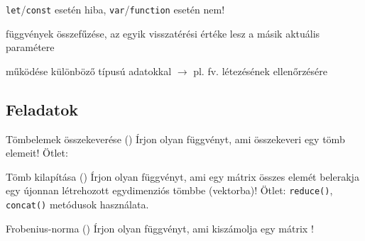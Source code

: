 \begin{frame}
  \footnotesize
  \begin{exampleblock}{ \texttt{let}/\texttt{const} esetén hiba, \texttt{var}/\texttt{function} esetén nem!}
      \scriptsize
      \vspace{-0.3cm}
      
      \vspace{-0.3cm}
  \end{exampleblock}
\end{frame}

\begin{frame}
  \begin{exampleblock}{ függvények összefűzése, az egyik visszatérési értéke lesz a másik aktuális paramétere}
      \footnotesize
      
  \end{exampleblock}
\end{frame}

\begin{frame}
  \begin{exampleblock}{ működése különböző típusú adatokkal $\to$ pl. fv. létezésének ellenőrzésére}
      
  \end{exampleblock}
\end{frame}

\subsection{Feladatok}

\begin{frame}
  \begin{exampleblock}{Tömbelemek összekeverése ()}
    Írjon olyan függvényt, ami összekeveri egy tömb elemeit! Ötlet: 
  \end{exampleblock}
  \vfill
  \begin{exampleblock}{Tömb kilapítása ()}
    Írjon olyan függvényt, ami egy mátrix összes elemét belerakja egy újonnan létrehozott egydimenziós tömbbe (vektorba)! Ötlet: \texttt{reduce()}, \texttt{concat()} metódusok használata.
  \end{exampleblock}
\end{frame}

\begin{frame}
  \begin{exampleblock}{Frobenius-norma ()}
    Írjon olyan függvényt, ami kiszámolja egy mátrix !
  \end{exampleblock}
\end{frame}
